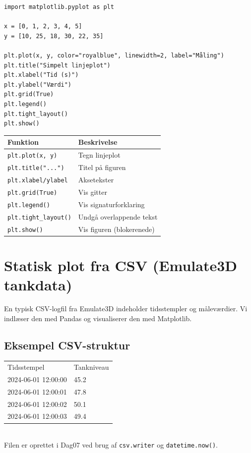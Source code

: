 \documentclass[12pt, a4paper]{article}
\begin{document}
\begin{tcolorbox}[pythonbox, title={\faPython\quad Kode 0 --- Enkelt introduktionsplot}]
\begin{verbatim}
import matplotlib.pyplot as plt

x = [0, 1, 2, 3, 4, 5]
y = [10, 25, 18, 30, 22, 35]

plt.plot(x, y, color="royalblue", linewidth=2, label="Måling")
plt.title("Simpelt linjeplot")
plt.xlabel("Tid (s)")
plt.ylabel("Værdi")
plt.grid(True)
plt.legend()
plt.tight_layout()
plt.show()
\end{verbatim}
\end{tcolorbox}

\begin{center}
\begin{tabular}{lp{8cm}}
\toprule
\textbf{Funktion} & \textbf{Beskrivelse} \\
\midrule
\texttt{plt.plot(x, y)} & Tegn linjeplot \\
\texttt{plt.title("...")} & Titel på figuren \\
\texttt{plt.xlabel/ylabel} & Aksetekster \\
\texttt{plt.grid(True)} & Vis gitter \\
\texttt{plt.legend()} & Vis signaturforklaring \\
\texttt{plt.tight\_layout()} & Undgå overlappende tekst \\
\texttt{plt.show()} & Vis figuren (blokerenede) \\
\bottomrule
\end{tabular}
\end{center}
\clearpage
\section{Statisk plot fra CSV (Emulate3D tankdata)}

En typisk CSV-logfil fra Emulate3D indeholder tidsstempler og måleværdier.
Vi indlæser den med Pandas og visualiserer den med Matplotlib.

\subsection{Eksempel CSV-struktur}

\begin{tcolorbox}[infobox, title={\faInfoCircle\quad Eksempel: tankniveau\_log.csv}]
\ttfamily\small
\begin{tabular}{ll}
Tidsstempel & Tankniveau \\
2024-06-01 12:00:00 & 45.2 \\
2024-06-01 12:00:01 & 47.8 \\
2024-06-01 12:00:02 & 50.1 \\
2024-06-01 12:00:03 & 49.4 \\
\end{tabular}\\[4pt]
\normalfont\small
Filen er oprettet i Dag07 ved brug af \texttt{csv.writer} og \texttt{datetime.now()}.
\end{tcolorbox}
\end{document}
